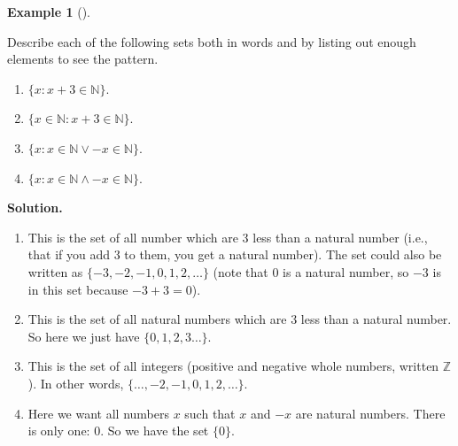 \documentclass[10pt,]{book}
\theoremstyle{plain}
\theoremstyle{definition}
\newtheorem{example}[theorem]{Example}
\theoremstyle{definition}
\theoremstyle{definition}
\def\N{\mathbb N}
\def\Z{\mathbb Z}
\def\st{:}
\begin{document}
\begin{example}[]\label{example-1}

          Describe each of the following sets both in words and by listing out enough elements to see the pattern.
\leavevmode%
\begin{enumerate}
\item\hypertarget{li-8}{}\(\{x \st x + 3 \in \N\}\).\item\hypertarget{li-9}{}\(\{x \in \N \st x + 3 \in \N\}\).\item\hypertarget{li-10}{}\(\{x \st x \in \N \vee -x \in \N\}\).\item\hypertarget{li-11}{}\(\{x \st x \in \N \wedge -x \in \N\}\).\end{enumerate}
\par\medskip\noindent%
\textbf{Solution.}\quad \leavevmode%
\begin{enumerate}
\item\hypertarget{li-12}{}
              This is the set of all number which are 3 less than a natural number (i.e., that if you add 3 to them, you get a natural number). The set could also be written as \(\{-3, -2, -1, 0, 1, 2, \ldots\}\) (note that 0 is a natural number, so
              \(-3\) is in this set because \(-3 + 3 = 0\)).
\item\hypertarget{li-13}{}
              This is the set of all natural numbers which are 3 less than a natural number. So here we just have \(\{0, 1, 2,3 \ldots\}\).
\item\hypertarget{li-14}{}
              This is the set of all integers
               (positive and negative whole numbers, written \(\Z\)). In other words, \(\{\ldots, -2, -1, 0, 1, 2, \ldots\}\).
\item\hypertarget{li-15}{}
              Here we want all numbers \(x\) such that \(x\) and \(-x\) are natural numbers. There is only one: 0. So we have the set \(\{0\}\).
\end{enumerate}
\end{example}
\par
\end{document}
